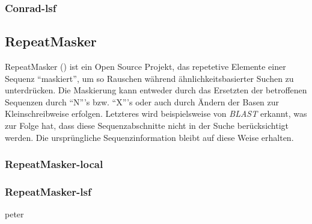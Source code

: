 \subsubsection{Conrad-lsf}
\subsection{RepeatMasker}
RepeatMasker
()
ist ein Open Source Projekt, das repetetive Elemente einer Sequenz
\enquote{maskiert}, um so Rauschen während ähnlichkeitsbasierter Suchen zu
unterdrücken.
Die Maskierung kann entweder durch das Ersetzten der betroffenen Sequenzen
durch \enquote{N}'s bzw. \enquote{X}'s oder auch durch Ändern der Basen zur
Kleinschreibweise erfolgen.
Letzteres wird beispielsweise von \textit{BLAST} erkannt, was zur Folge hat,
dass diese Sequenzabschnitte nicht in der Suche berücksichtigt werden.
Die ursprüngliche Sequenzinformation bleibt auf diese Weise	erhalten.
\subsubsection{RepeatMasker-local}
\subsubsection{RepeatMasker-lsf}
peter
